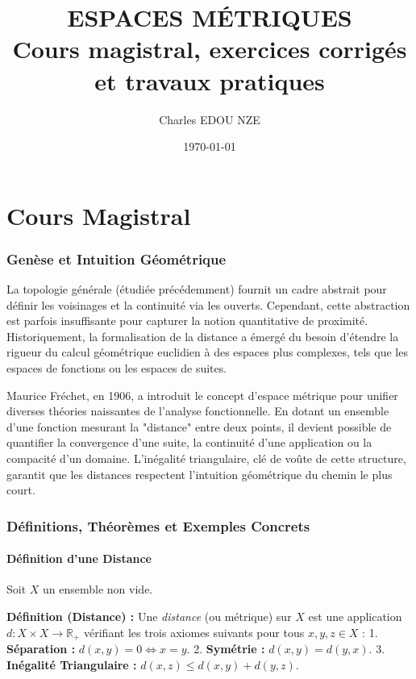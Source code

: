 \documentclass[11pt,a4paper]{article}
\title{\Huge ESPACES MÉTRIQUES \\ \large Cours magistral, exercices corrigés et travaux pratiques}
\author{\Large Charles EDOU NZE}
\date{\today}
\begin{document}
\maketitle
\tableofcontents
\newpage

\part{Cours Magistral}


\section{Genèse et Intuition Géométrique}

La topologie générale (étudiée précédemment) fournit un cadre abstrait pour définir les voisinages et la continuité via les ouverts. Cependant, cette abstraction est parfois insuffisante pour capturer la notion quantitative de proximité. Historiquement, la formalisation de la distance a émergé du besoin d'étendre la rigueur du calcul géométrique euclidien à des espaces plus complexes, tels que les espaces de fonctions ou les espaces de suites.

Maurice Fréchet, en 1906, a introduit le concept d'espace métrique pour unifier diverses théories naissantes de l'analyse fonctionnelle. En dotant un ensemble d'une fonction mesurant la "distance" entre deux points, il devient possible de quantifier la convergence d'une suite, la continuité d'une application ou la compacité d'un domaine. L'inégalité triangulaire, clé de voûte de cette structure, garantit que les distances respectent l'intuition géométrique du chemin le plus court.

\section{Définitions, Théorèmes et Exemples Concrets}

\subsection{Définition d'une Distance}

Soit $X$ un ensemble non vide.

\textbf{Définition (Distance) :}
Une \textit{distance} (ou métrique) sur $X$ est une application $d : X \times X \to \mathbb{R}_+$ vérifiant les trois axiomes suivants pour tous $x, y, z \in X$ :
1. \textbf{Séparation :} $d(x, y) = 0 \iff x = y$.
2. \textbf{Symétrie :} $d(x, y) = d(y, x)$.
3. \textbf{Inégalité Triangulaire :} $d(x, z) \le d(x, y) + d(y, z)$.
\end{document}
